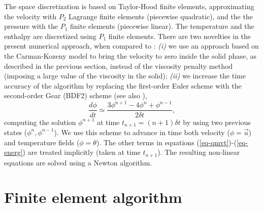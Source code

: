 The space discretization is based on Taylor-Hood finite elements, approximating  the velocity with $P_{2}$ Lagrange finite elements (piecewise quadratic), and the
the pressure with the $P_{1}$ finite elements (piecewise linear). The temperature and the enthalpy are discretized using $P_1$ finite elements.  
There are two novelties in the present numerical approach, when compared to  \cite{dan-2014-JCP}: 
{\em (i)} we use an approach based on the Carman-Kozeny model to bring the velocity to zero inside the solid phase, as described in the previous section, instead of the  viscosity penalty method (imposing a large value of the viscosity in the solid);
{\em (ii)} we increase  the time accuracy of the algorithm by replacing the first-order Euler scheme with the second-order Gear (BDF2) scheme (see also \cite{Belhamadia2012}),
\begin{equation}	
\label{eq-Gear}
	\frac{d\phi}{dt} \simeq \frac{3\phi^{n+1} - 4\phi^{n}+ \phi^{n-1}}{2\delta t},
\end{equation}
computing the solution $\phi^{n+1}$ at time  $t_{n+1}=(n+1) \delta t$ by using two previous states ($\phi^{n}, \phi^{n-1}$). We use this scheme to advance in time both velocity ($\phi=\vec{u}$) and temperature fields  ($\phi=\theta$).  The other terms in equations (\ref{eq-qmvt})-(\ref{eq-energ}) are treated implicitly (\ie taken at time $t_{n+1}$). The resulting non-linear equations are solved using a Newton algorithm. 

\section{Finite element algorithm} \label{sec-FE-algo}

